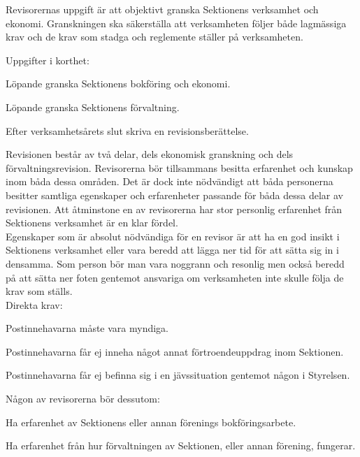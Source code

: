 \documentclass[10pt]{article}
\def\post{Revisor}
\def\doctitle{Kravprofil för \post}
\begin{document}
    \heading{\doctitle}
    
    
    Revisorernas uppgift är att objektivt granska Sektionens verksamhet och ekonomi. Granskningen ska säkerställa att verksamheten följer både lagmässiga krav och de krav som stadga och reglemente ställer på verksamheten.
    
    
    Uppgifter i korthet:
    \begin{dashlist}
        \item Löpande granska Sektionens bokföring och ekonomi.
        \item Löpande granska Sektionens förvaltning.
        \item Efter verksamhetsårets slut skriva en revisionsberättelse.
    \end{dashlist}
    
    Revisionen består av två delar, dels ekonomisk granskning och dels förvaltningsrevision. Revisorerna bör tillsammans besitta erfarenhet och kunskap inom båda dessa områden. Det är dock inte nödvändigt att båda personerna besitter samtliga egenskaper och erfarenheter passande för båda dessa delar av revisionen. Att åtminstone en av revisorerna har stor personlig erfarenhet från Sektionens verksamhet är en klar fördel.\\

    Egenskaper som är absolut nödvändiga för en revisor är att ha en god insikt i Sektionens verksamhet eller vara beredd att lägga ner tid för att sätta sig in i densamma. Som person bör man vara noggrann och resonlig men också beredd på att sätta ner foten gentemot ansvariga om verksamheten inte skulle följa de krav som ställs.\\
    
    Direkta krav:
    \begin{dashlist}
        \item Postinnehavarna måste vara myndiga.
        \item Postinnehavarna får ej inneha något annat förtroendeuppdrag inom Sektionen.
        \item Postinnehavarna får ej befinna sig i en jävssituation gentemot någon i Styrelsen.
    \end{dashlist}

    Någon av revisorerna bör dessutom:
    \begin{dashlist}
        \item Ha erfarenhet av Sektionens eller annan förenings bokföringsarbete.
        \item Ha erfarenhet från hur förvaltningen av Sektionen, eller annan förening, fungerar.
    \end{dashlist}
    
    
\end{document}

